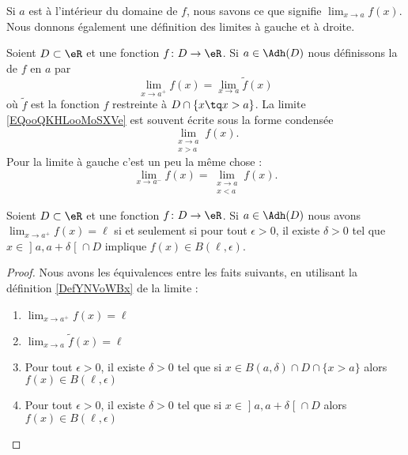 Si \( a\) est à l'intérieur du domaine de \( f\), nous savons ce que signifie \( \lim_{x\to a} f(x)\). Nous donnons également une définition des limites à gauche et à droite.

\begin{definition}
	Soient \( D\subset \eR\) et une fonction \( f\colon D\to \eR\). Si \( a\in \Adh(D)\) nous définissons la  de \( f\) en \( a\) par
	\begin{equation}        \label{EQooQKHLooMoSXVe}
		\lim_{x\to a^+} f(x)=\lim_{x\to a} \tilde f(x)
	\end{equation}
	où \( \tilde f\) est la fonction \( f\) restreinte à \( D\cap\{ x\tq x>a \}\). La limite \eqref{EQooQKHLooMoSXVe} est souvent écrite sous la forme condensée
	\begin{equation}
		\lim_{\substack{x\to a\\x>a}}f(x).
	\end{equation}
	Pour la limite à gauche c'est un peu la même chose :
	\begin{equation}
		\lim_{x\to a^-} f(x)=\lim_{\substack{x\to a\\x<a}}f(x).
	\end{equation}
\end{definition}

\begin{lemma}       \label{LEMooXJMFooCkzoVi}
	Soient \( D\subset \eR\) et une fonction \( f\colon D\to \eR\). Si \( a\in \Adh(D)\) nous avons \( \lim_{x\to a^+} f(x)=\ell\) si et seulement si pour tout \( \epsilon>0\), il existe \( \delta>0\) tel que  \( x\in\mathopen] a , a+\delta \mathclose[\cap D\) implique \( f(x)\in B(\ell,\epsilon)\).
\end{lemma}

\begin{proof}
	Nous avons les équivalences entre les faits suivants, en utilisant la définition \ref{DefYNVoWBx} de la limite :
	\begin{enumerate}
		\item
		      \( \lim_{x\to a^+} f(x)=\ell\)
		\item
		      \( \lim_{x\to a} \tilde f(x)=\ell\)
		\item
		      Pour tout \( \epsilon>0\), il existe \( \delta>0\) tel que si \( x\in B(a,\delta)\cap D\cap\{ x>a \}\) alors \( f(x)\in B(\ell,\epsilon)\)
		\item
		      Pour tout \( \epsilon>0\), il existe \( \delta>0\) tel que si \( x\in \mathopen] a , a+\delta \mathclose[\cap D\) alors \( f(x)\in B(\ell,\epsilon)\)
	\end{enumerate}
\end{proof}

